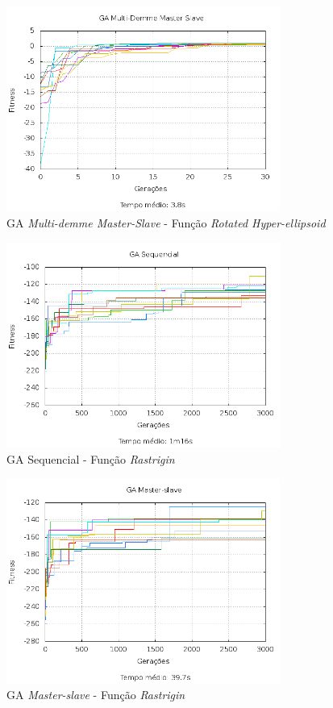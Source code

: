 \documentclass[12pt]{article}
\begin{document}
\begin{figure}[hp]
  \centering
  \includegraphics[width=0.8\textwidth]{mdms_f2.png}
  \caption{GA \emph{Multi-demme Master-Slave} - Função \emph{Rotated Hyper-ellipsoid}}
\end{figure}

\begin{figure}[hp]
  \centering
  \includegraphics[width=0.8\textwidth]{seq_f3.png}
  \caption{GA Sequencial - Função \emph{Rastrigin}}
\end{figure}

\begin{figure}[hp]
  \centering
  \includegraphics[width=0.8\textwidth]{ms_f3.png}
  \caption{GA \emph{Master-slave} - Função \emph{Rastrigin}}
\end{figure}
\end{document}
